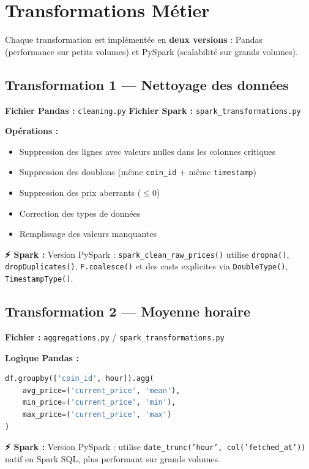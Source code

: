 \documentclass[12pt,a4paper]{article}
\newcommand{\sparkbox}[1]{%
  \vspace{4pt}
  \noindent\colorbox{orange!15}{\parbox{\dimexpr\linewidth-2\fboxsep}{%
    {\color{sparkcolor}\textbf{⚡ Spark :}} #1
  }}
  \vspace{4pt}
}
\begin{document}
\section{Transformations Métier}

Chaque transformation est implémentée en \textbf{deux versions} : Pandas (performance sur petits volumes) et PySpark (scalabilité sur grands volumes).

\subsection{Transformation 1 — Nettoyage des données}
\textbf{Fichier Pandas :} \texttt{cleaning.py} \quad \textbf{Fichier Spark :} \texttt{spark\_transformations.py}

\textbf{Opérations :}
\begin{itemize}[noitemsep]
    \item Suppression des lignes avec valeurs nulles dans les colonnes critiques
    \item Suppression des doublons (même \texttt{coin\_id} + même \texttt{timestamp})
    \item Suppression des prix aberrants ($\leq 0$)
    \item Correction des types de données
    \item Remplissage des valeurs manquantes
\end{itemize}

\sparkbox{Version PySpark : \texttt{spark\_clean\_raw\_prices()} utilise \texttt{dropna()}, \texttt{dropDuplicates()}, \texttt{F.coalesce()} et des casts explicites via \texttt{DoubleType()}, \texttt{TimestampType()}.}

\subsection{Transformation 2 — Moyenne horaire}
\textbf{Fichier :} \texttt{aggregations.py} / \texttt{spark\_transformations.py}

\textbf{Logique Pandas :}
\begin{lstlisting}[language=Python]
df.groupby(['coin_id', hour]).agg(
    avg_price=('current_price', 'mean'),
    min_price=('current_price', 'min'),
    max_price=('current_price', 'max')
)
\end{lstlisting}

\sparkbox{Version PySpark : utilise \texttt{date\_trunc('hour', col('fetched\_at'))} natif en Spark SQL, plus performant sur grands volumes.}
\end{document}
